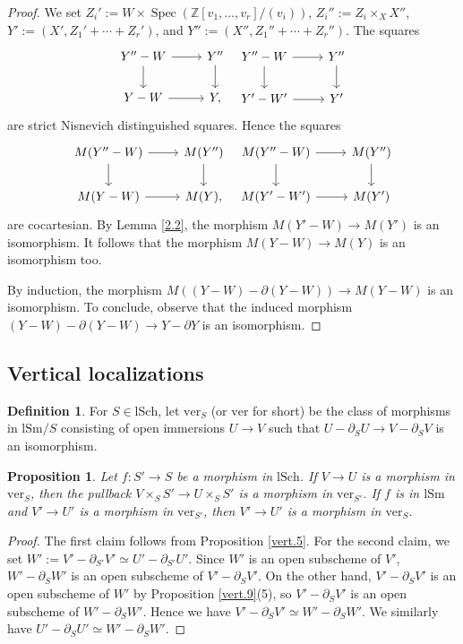 \documentclass[10pt]{amsart}
\newtheorem{prop}[thm]{Proposition}
\theoremstyle{definition}
\newtheorem{df}[thm]{Definition}
\theoremstyle{remark}
\numberwithin{equation}{subsection}
\newcommand{\Z}{\mathbb{Z}}
\DeclareMathOperator{\Spec}{Spec}
\newcommand{\lSch}{\mathrm{lSch}}
\newcommand{\lSm}{\mathrm{lSm}}
\newcommand{\ver}{\mathrm{ver}}
\begin{document}
\begin{proof}
We set $Z_i':=W\times \Spec(\Z[v_1,\ldots,v_r]/(v_i))$, $Z_i'':=Z_i\times_X X''$, $Y':=(X',Z_1'+\cdots+Z_r')$, and $Y'':=(X'',Z_1''+\cdots+Z_r'')$.
The squares
\[
\begin{tikzcd}
Y''-W\ar[r]\ar[d]&
Y''\ar[d]
\\
Y-W\ar[r]&
Y,
\end{tikzcd}
\;\;
\begin{tikzcd}
Y''-W\ar[r]\ar[d]&
Y''\ar[d]
\\
Y'-W'\ar[r]&
Y'
\end{tikzcd}
\]
are strict Nisnevich distinguished squares.
Hence the squares
\[
\begin{tikzcd}
M(Y''-W)\ar[r]\ar[d]&
M(Y'')\ar[d]
\\
M(Y-W)\ar[r]&
M(Y),
\end{tikzcd}
\;\;
\begin{tikzcd}
M(Y''-W)\ar[r]\ar[d]&
M(Y'')\ar[d]
\\
M(Y'-W')\ar[r]&
M(Y')
\end{tikzcd}
\]
are cocartesian.
By Lemma \ref{2.2}, the morphism $M(Y'-W)\to M(Y')$ is an isomorphism.
It follows that the morphism $M(Y-W)\to M(Y)$ is an isomorphism too.

By induction, the morphism $M((Y-W)-\partial (Y-W))\to M(Y-W)$ is an isomorphism.
To conclude, observe that the induced morphism $(Y-W)-\partial (Y-W)\to Y-\partial Y$ is an isomorphism.
\end{proof}




\subsection{Vertical localizations}
\label{vertical_localizations}

\begin{df}
For $S\in \lSch$,
let $\ver_S$ (or $\ver$ for short) be the class of morphisms in $\lSm/S$ consisting of open immersions $U\to V$ such that $U-\partial_S U\to V-\partial_S V$ is an isomorphism.
\end{df}

\begin{prop}
\label{comp.4}
Let $f\colon S'\to S$ be a morphism in $\lSch$.
If $V\to U$ is a morphism in $\ver_S$, then the pullback $V\times_S S'\to U\times_S S'$ is a morphism in $\ver_{S'}$.
If $f$ is in $\lSm$ and $V'\to U'$ is a morphism in $\ver_{S'}$, then $V'\to U'$ is a morphism in $\ver_S$.
\end{prop}
\begin{proof}
The first claim follows from Proposition \ref{vert.5}.
For the second claim, we set $W':=V'-\partial_{S'}V'\simeq U'-\partial_{S'}U'$.
Since $W'$ is an open subscheme of $V'$, $W'-\partial_S W'$ is an open subscheme of $V'-\partial_S V'$.
On the other hand, $V'-\partial_S V'$ is an open subscheme of $W'$ by Proposition \ref{vert.9}(5), so $V'-\partial_S V'$ is an open subscheme of $W'-\partial_S W'$.
Hence we have $V'-\partial_S V'\simeq W'-\partial_S W'$.
We similarly have $U'-\partial_S U'\simeq W'-\partial_S W'$.
\end{proof}
\end{document}
